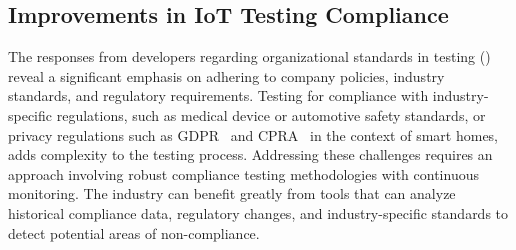 \subsection{Improvements in IoT Testing Compliance}
The responses from \iot developers regarding organizational standards in testing () reveal a significant emphasis on adhering to company policies, industry standards, and regulatory requirements. 
Testing for compliance with industry-specific regulations, such as medical device or automotive safety standards, or privacy regulations such as GDPR~\cite{gdpr} and CPRA~\cite{CPRA} in the context of smart homes, adds complexity to the testing process. 
Addressing these challenges requires an approach involving robust compliance testing methodologies with continuous monitoring. 
The \iot industry can benefit greatly from tools that can analyze historical compliance data, regulatory changes, and industry-specific standards to detect potential areas of non-compliance. 





